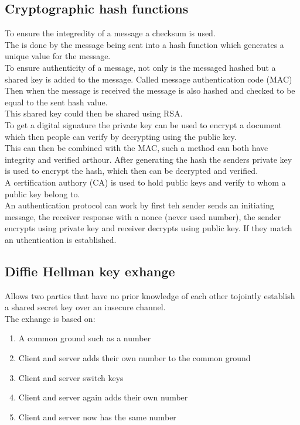 \documentclass[12pt, a4paper]{article}
\begin{document}
		\subsection{Cryptographic hash functions}
			To ensure the integredity of a message a checksum is used.\\
			The is done by the message being sent into a hash function which generates a unique value for the message.\\
			To ensure authenticity of a message, not only is the messaged hashed but a shared key is added to the message. Called message authentication code (MAC)\\
			Then when the message is received the message is also hashed and checked to be equal to the sent hash value.\\
			This shared key could then be shared using RSA.\\[4mm]
			To get a digital signature the private key can be used to encrypt a document which then people can verify by decrypting using the public key.\\
			This can then be combined with the MAC, such a method can both have integrity and verified arthour. After generating the hash the senders private key is used to encrypt the hash, which then can be decrypted and verified.\\
			A certification authory (CA) is used to hold public keys and verify to whom a public key belong to.\\
			An authentication protocol can work by first teh sender sends an initiating message, the receiver response with a nonce (never used number), the sender encrypts using private key and receiver decrypts using public key. If they match an uthentication is established.\\
		
		\subsection{Diffie Hellman key exhange}
			Allows two parties that have no prior knowledge of each other tojointly establish a shared secret key over an insecure channel.\\
			The exhange is based on:
			\begin{enumerate}
				\item A common ground such as a number
				\item Client and server adds their own number to the common ground
				\item Client and server switch keys
				\item Client and server again adds their own number
				\item Client and server now has the same number
			\end{enumerate}
\end{document}
